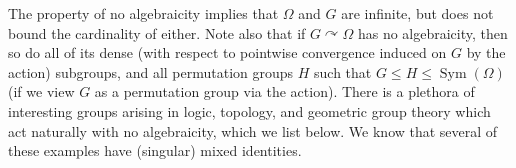 \documentclass{article}
\theoremstyle{remark}
\theoremstyle{definition}
\def\acts{\curvearrowright}
\newcommand{\remmic}[1]{\textcolor{orange}{MP: #1}}
\DeclareMathOperator{\Sym}{Sym}
\begin{document}
The property of no algebraicity implies that $\Omega$ and $G$ are infinite, but does not bound the cardinality of either. Note also that if $G\acts\Omega$ has no algebraicity, then so do all of its dense {(with respect to pointwise convergence induced on $G$ by the action)} subgroups, and all permutation groups $H$ such that $G\leq H\leq \Sym(\Omega)$ {(if we view $G$ as a permutation group via the action)}. There is a plethora of interesting groups arising in logic, topology, and geometric group theory {which act naturally} with no algebraicity, %
 which we list below. We know that several of these examples have (singular) mixed identities.%
\end{document}
